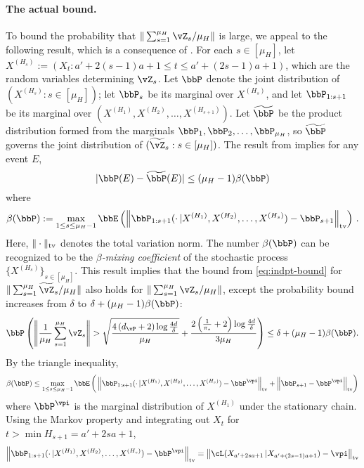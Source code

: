 \paragraph{The actual bound.}
To bound the probability that $\norm{\sum_{s=1}^{\mu_H} \vZ_s/\mu_H}$
is large, we appeal to the following result, which is a consequence of
\citep[Corollary 2.7]{Yu94}.
For each $s \in [\mu_H]$, let $X^{(H_s)} := (X_t : a' + 2(s-1)a + 1
\leq t \leq a' + (2s-1)a + 1)$, which are the random variables
determining $\vZ_s$.
Let $\bbP$ denote the joint distribution of $(X^{(H_s)} : s \in
[\mu_H])$; let $\bbP_s$ be its marginal over $X^{(H_s)}$, and let
$\bbP_{1:s+1}$ be its marginal over
$(X^{(H_1)},X^{(H_2)},\dotsc,X^{(H_{s+1})})$.
Let $\wt\bbP$ be the product distribution formed from the marginals
$\bbP_1,\bbP_2,\dotsc,\bbP_{\mu_H}$, so $\wt\bbP$ governs the joint
distribution of $(\wt\vZ_s : s \in [\mu_H])$.
The result from \citep[Corollary 2.7]{Yu94} implies for any event $E$,
\[
  |\bbP(E) - \wt\bbP(E)| \leq (\mu_H-1) \beta(\bbP)
\]
where
\[
  \beta(\bbP)
  :=
  \max_{1 \leq s \leq \mu_H-1}
  \bbE\Parens{
    \Norm{
      \bbP_{1:s+1}(\cdot\,|X^{(H_1)},X^{(H_2)},\dotsc,X^{(H_s)}) - \bbP_{s+1}
    }_{\tv}
  }
  \,.
\]
Here, $\|\cdot\|_{\operatorname{tv}}$ denotes the total variation norm.
The number $\beta(\bbP)$ can be recognized to be the
\emph{$\beta$-mixing coefficient} of the stochastic process
$\{X^{(H_s)}\}_{s \in [\mu_H]}$.
This result implies that the bound from \cref{eq:indpt-bound} for
$\norm{\sum_{s=1}^{\mu_H} \wt\vZ_s/\mu_H}$ also holds for
$\norm{\sum_{s=1}^{\mu_H} \vZ_s/\mu_H}$, except the probability
bound increases from $\delta$ to $\delta + (\mu_H-1)\beta(\bbP)$:
\begin{equation}
  \bbP\Parens{
    \Norm{ \frac1{\mu_H} \sum_{s=1}^{\mu_H} \vZ_s}
    >
    \sqrt{
      \frac{4\Parens{ d_{\vP} + 2 } \log\frac{4d}{\delta}}
      {\mu_H}
    }
    + \frac{2\Parens{ \frac1{\pimin} + 2 } \log\frac{4d}{\delta}}
    {3\mu_H}
  } \leq \delta + (\mu_H-1)\beta(\bbP)
  .
  \label{eq:dpt-bound}
\end{equation}
By the triangle inequality,
\[
  \beta(\bbP)
  \leq
  \max_{1 \leq s \leq \mu_H-1}
  \bbE\Parens{
    \vphantom{\bigg\vert}
    \Norm{
      \bbP_{1:s+1}(\cdot\,|X^{(H_1)},X^{(H_2)},\dotsc,X^{(H_s)})
      - \bbP^{\vpi}
    }_{\tv}
    +
    \Norm{
      \bbP_{s+1}
      - \bbP^{\vpi}
    }_{\tv}
  }
\]
where $\bbP^{\vpi}$ is the marginal distribution of $X^{(H_1)}$ under
the stationary chain.
Using the Markov property and integrating out $X_t$ for $t >
\min H_{s+1} = a'+2sa+1$,
\[
  \Norm{
    \bbP_{1:s+1}(\cdot\,|X^{(H_1)},X^{(H_2)},\dotsc,X^{(H_s)})
    - \bbP^{\vpi}
  }_{\tv}
  =
  \Norm{
    \cL(X_{a'+2sa+1}\,|X_{a'+(2s-1)a+1})
    - \vpi
  }_{\tv}
\]
